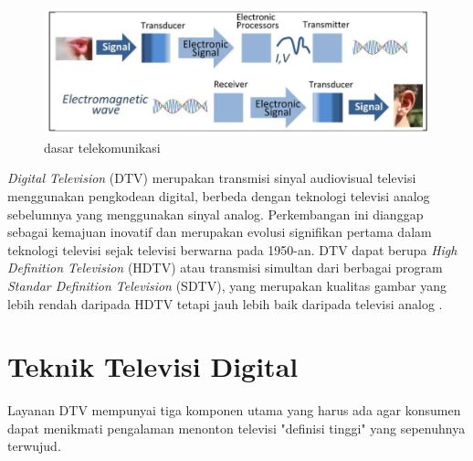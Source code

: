 \begin{figure}[H]
	\vspace{-0.1cm}
	\begin{center}
		\includegraphics[width=0.9\columnwidth]{bab2/Gambar/SANDY. dasar telkom.png}
	\end{center}
	\vspace{-0.2cm}
	\caption{dasar telekomunikasi \citep{ElSaba2018}}\label{dasar telekomunikasi}
\end{figure}

\textit{Digital Television} (DTV) merupakan transmisi sinyal audiovisual televisi menggunakan pengkodean digital, berbeda dengan teknologi televisi analog sebelumnya yang menggunakan sinyal analog. Perkembangan ini dianggap sebagai kemajuan inovatif dan merupakan evolusi signifikan pertama dalam teknologi televisi sejak televisi berwarna pada 1950-an. DTV dapat berupa \textit{High Definition Television} (HDTV) atau transmisi simultan dari berbagai program \textit{Standar Definition Television} (SDTV), yang merupakan kualitas gambar yang lebih rendah daripada HDTV tetapi jauh lebih baik daripada televisi analog \citep{Kruger2002}.

\section{Teknik Televisi Digital}
\hspace{1,2cm}Layanan DTV mempunyai tiga komponen utama yang harus ada agar konsumen dapat menikmati pengalaman menonton televisi "definisi tinggi" yang sepenuhnya terwujud.


